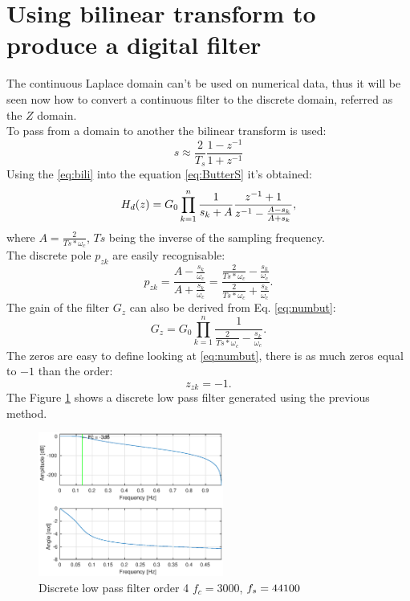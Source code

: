 \documentclass[twoside,twocolumn]{article}
\begin{document}
\section{Using bilinear transform to produce a digital filter}
The continuous Laplace domain can't be used on numerical data,  thus it will be seen now how to convert a continuous filter to the discrete domain, referred as the $Z$ domain.\\
To pass from a domain to another the bilinear transform is used:
\begin{equation}
	s \approx \frac{2}{T_s}\frac{1-z^{-1}}{1+z^{-1}}
	\label{eq:bili}
\end{equation} 
Using the \ref{eq:bili} into the equation \ref{eq:ButterS} it's obtained:
\begin{equation}
	H_d(z)=G_0\prod_{k=1}^{n} \frac{1}{s_k+A} \space \frac{z^{-1}+1}{z^{-1} -\frac{A-s_k}{A+s_k}},
	\label{eq:numbut}
\end{equation}
where $A=\frac{2}{Ts*\omega_c}$, $Ts$ being the inverse of the sampling frequency.\\
The discrete pole $p_{zk}$ are easily recognisable:
\begin{equation}
p_{zk}=\frac{A-\frac{s_k}{\omega_c}}{A+\frac{s_k}{\omega_c}}=\frac{\frac{2}{Ts*\omega_c}-\frac{s_k}{\omega_c}}{\frac{2}{Ts*\omega_c}+\frac{s_k}{\omega_c}}.
\end{equation} 
The gain of the filter $G_z$ can also be derived from Eq. \ref{eq:numbut}:
\begin{equation}
G_z=G_0 \prod_{k=1}^{n} \frac{1}{\frac{2}{Ts*\omega_c}-\frac{s_k}{\omega_c}}.
\end{equation}
The zeros are easy to define looking at \ref{eq:numbut}, there is as much zeros equal to $-1$ than the order:
\begin{equation}
z_{zk}=-1.
\end{equation}
The Figure \ref{numlow} shows a discrete low pass filter generated using the previous method.
 \begin{figure}[h!]
 	\centering
 	\includegraphics[width=230px]{./images/Buttnumcny.eps}
 	\caption{Discrete low pass filter order 4 $f_{c}=3000$, $f_{s}=44100\\$ }
 	\label{numlow}
 \end{figure}
\end{document}
